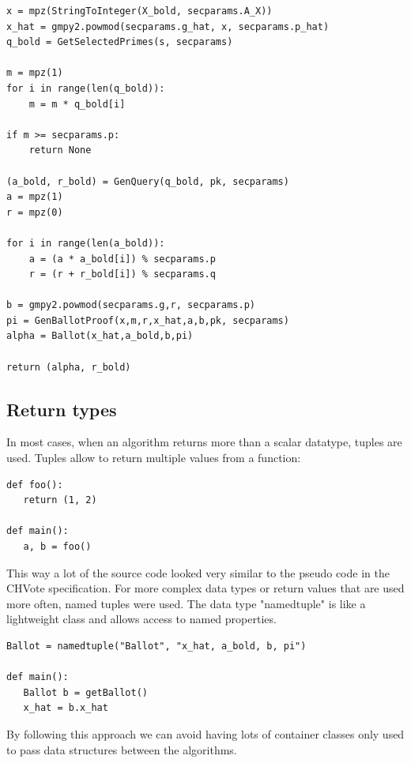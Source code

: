 \begin{multicols}{2}
\columnbreak
\begin{verbatim}
x = mpz(StringToInteger(X_bold, secparams.A_X))
x_hat = gmpy2.powmod(secparams.g_hat, x, secparams.p_hat)
q_bold = GetSelectedPrimes(s, secparams)

m = mpz(1)
for i in range(len(q_bold)):
    m = m * q_bold[i]

if m >= secparams.p:
    return None

(a_bold, r_bold) = GenQuery(q_bold, pk, secparams)
a = mpz(1)
r = mpz(0)

for i in range(len(a_bold)):
    a = (a * a_bold[i]) % secparams.p
    r = (r + r_bold[i]) % secparams.q

b = gmpy2.powmod(secparams.g,r, secparams.p)
pi = GenBallotProof(x,m,r,x_hat,a,b,pk, secparams)
alpha = Ballot(x_hat,a_bold,b,pi)

return (alpha, r_bold)
\end{verbatim}
\end{multicols}

\subsection{Return types}
In most cases, when an algorithm returns more than a scalar datatype, tuples are used. Tuples allow to return multiple values from a function:

\begin{verbatim}
def foo():
   return (1, 2)

def main():
   a, b = foo()
\end{verbatim}

This way a lot of the source code looked very similar to the pseudo code in the CHVote specification. For more complex data types or return values that are used more often, named tuples were used. The data type "namedtuple" is like a lightweight class and allows access to named properties.

\begin{verbatim}
Ballot = namedtuple("Ballot", "x_hat, a_bold, b, pi")

def main():
   Ballot b = getBallot()
   x_hat = b.x_hat
\end{verbatim}

By following this approach we can avoid having lots of container classes only used to pass data structures between the algorithms.


